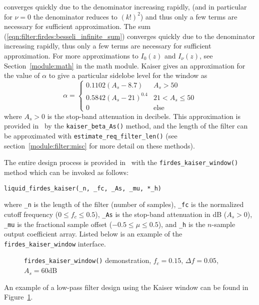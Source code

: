 converges quickly due to the denominator increasing rapidly, 
(and in particular for $\nu=0$ the denominator reduces to $(k!)^2$)
and thus only a few terms are necessary for sufficient approximation.
%
The sum (\ref{eqn:filter:firdes:besseli_infinite_sum}) converges quickly
due to the denominator increasing rapidly, thus only a few terms are
necessary for sufficient approximation.
For more approximations to $I_0(z)$ and $I_\nu(z)$,
see Section~\ref{module:math} in the math module.
%
Kaiser gives an approximation for the value of $\alpha$ to give a
particular sidelobe level for the window as
\cite[(3.2.7)]{Vaidyanathan:1993}
\begin{equation}
\label{eq:kaiser_alpha}
    \alpha =
    \begin{cases}
        0.1102 (A_s - 8.7)      &   A_s > 50 \\
        0.5842 (A_s - 21)^{0.4} &   21 < A_s \le 50 \\
        0                       &   \text{else}
    \end{cases}
\end{equation}
%
where $A_s > 0$ is the stop-band attenuation in decibels.
%
This approximation is provided in \liquid\ by the
{\tt kaiser\_beta\_As()} method,
and the length of the filter can be approximated with
{\tt estimate\_req\_filter\_len()}
(see section~\ref{module:filter:misc} for more detail on these methods).

The entire design process is provided in \liquid\ with the
{\tt firdes\_kaiser\_window()} method which can be invoked as follows:
%
\begin{Verbatim}[fontsize=\small]
    liquid_firdes_kaiser(_n, _fc, _As, _mu, *_h)
\end{Verbatim}
%
where
{\tt \_n} is the length of the filter (number of samples),
{\tt \_fc} is the normalized cutoff frequency ($0 \leq f_c \leq 0.5$),
{\tt \_As} is the stop-band attenuation in dB ($A_s > 0$),
{\tt \_mu} is the fractional sample offset ($-0.5 \leq \mu \leq 0.5$),
and {\tt *\_h} is the $n$-sample output coefficient array.
%
Listed below is an example of the {\tt firdes\_kaiser\_window}
interface.
%

%
\begin{figure}
\centering
{}
\caption{{\tt firdes\_kaiser\_window()} demonstration, $f_c=0.15$,
         $\Delta f=0.05$, $A_s=60$dB}
\label{fig:module:filter:firdes_kaiser}
\end{figure}
%
An example of a low-pass filter design using the Kaiser window can be
found in Figure~\ref{fig:module:filter:firdes_kaiser}.


